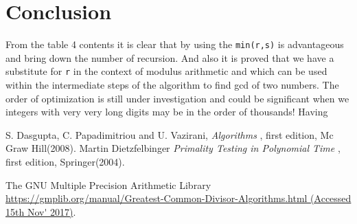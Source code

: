 \documentclass[12pt]{article}
\begin{document}
\section{Conclusion}
From the table 4 contents it is clear that by using the \texttt{min(r,s)} is advantageous and bring down the number of recursion. And also it is proved that we have a substitute for \texttt{r} in the context of modulus arithmetic and which can be used within the intermediate steps of the algorithm to find gcd of two numbers. The order of optimization is still under investigation and could be significant when we integers with very very long digits may be in the order of thousands! Having 


\begin{thebibliography}{6}

S. Dasgupta, C. Papadimitriou and U. Vazirani, \textsl{Algorithms
},
first edition, Mc Graw Hill(2008).
Martin Dietzfelbinger \textsl{Primality Testing in Polynomial Time
},
first edition, Springer(2004).

The GNU Multiple Precision Arithmetic Library \url{https://gmplib.org/manual/Greatest-Common-Divisor-Algorithms.html (Accessed 15th Nov' 2017)}.

\end{thebibliography}
\end{document}

